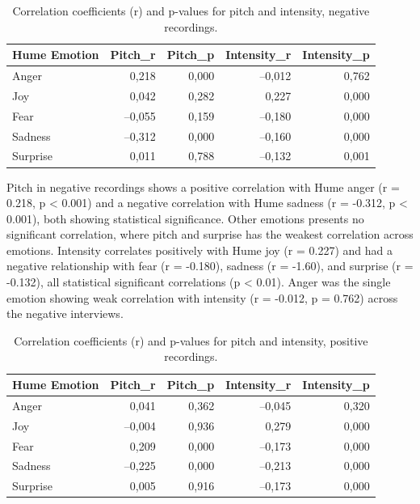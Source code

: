 \begin{table}[H]
    \centering
    \begin{tabular}{lrrrr}
      \toprule
      \textbf{Hume Emotion} & \textbf{Pitch\_r} & \textbf{Pitch\_p} & \textbf{Intensity\_r} & \textbf{Intensity\_p} \\
      \midrule
      Anger    & 0,218 & 0,000 & –0,012 & 0,762 \\
      Joy      & 0,042 & 0,282 &  0,227 & 0,000 \\
      Fear     & –0,055 & 0,159 & –0,180 & 0,000 \\
      Sadness  & –0,312 & 0,000 & –0,160 & 0,000 \\
      Surprise & 0,011 & 0,788 & –0,132 & 0,001 \\
      \bottomrule
    \end{tabular}
    \caption{Correlation coefficients (r) and p-values for pitch and intensity, negative recordings. }
    \label{tab:cor_neg}
  \end{table}
  
Pitch in negative recordings shows a positive correlation with Hume anger (r = 0.218, p < 0.001) and a negative correlation with Hume sadness (r = -0.312, p < 0.001), both showing statistical significance. 
Other emotions presents no significant correlation, where pitch and surprise has the weakest correlation across emotions. Intensity correlates positively with Hume joy (r = 0.227) and had a negative relationship with fear (r = -0.180), sadness (r = -1.60), and surprise (r = -0.132), all statistical significant correlations (p < 0.01). 
Anger was the single emotion showing weak correlation with intensity (r = -0.012, p = 0.762) across the negative interviews. 

  \begin{table}[H]
    \centering
    \begin{tabular}{lrrrr}
      \toprule
      \textbf{Hume Emotion} & \textbf{Pitch\_r} & \textbf{Pitch\_p} & \textbf{Intensity\_r} & \textbf{Intensity\_p} \\
      \midrule
      Anger    & 0,041 & 0,362 & –0,045 & 0,320 \\
      Joy      & –0,004 & 0,936 &  0,279 & 0,000 \\
      Fear     & 0,209 & 0,000 & –0,173 & 0,000 \\
      Sadness  & –0,225 & 0,000 & –0,213 & 0,000 \\
      Surprise & 0,005 & 0,916 & –0,173 & 0,000 \\
      \bottomrule
    \end{tabular}
    \caption{Correlation coefficients (r) and p-values for pitch and intensity, positive recordings. }
    \label{tab:cor_pos}
  \end{table}

